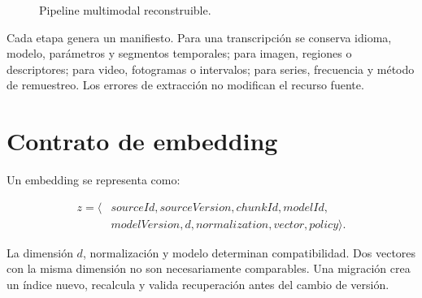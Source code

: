\begin{figure}[H]
\centering
{}
\caption{Pipeline multimodal reconstruible.}
\label{fig:pipeline-multimodal}
\end{figure}

Cada etapa genera un manifiesto. Para una transcripción se conserva idioma, modelo,
parámetros y segmentos temporales; para imagen, regiones o descriptores; para video,
fotogramas o intervalos; para series, frecuencia y método de remuestreo. Los errores de
extracción no modifican el recurso fuente.

\section{Contrato de embedding}

Un embedding se representa como:

\begin{equation}
\begin{aligned}
z=\langle &sourceId,sourceVersion,chunkId,modelId,\\
           &modelVersion,d,normalization,vector,policy\rangle.
\end{aligned}
\end{equation}

La dimensión $d$, normalización y modelo determinan compatibilidad. Dos vectores con la
misma dimensión no son necesariamente comparables. Una migración crea un índice nuevo,
recalcula y valida recuperación antes del cambio de versión.

